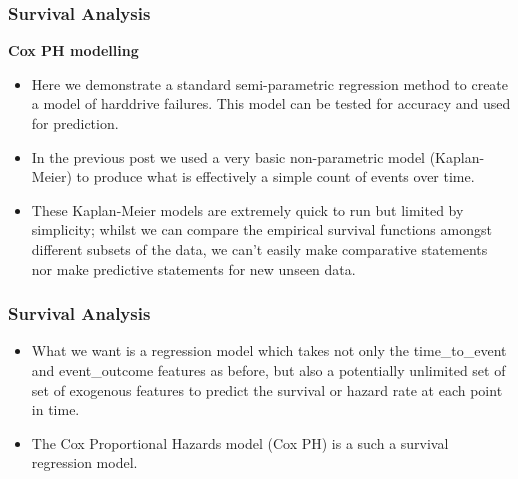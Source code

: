 \documentclass[]{beamer}
\begin{document}
	\begin{frame}
		\frametitle{Survival Analysis}
		\textbf{Cox PH modelling}
		
		\begin{itemize}
			\item Here we demonstrate a standard semi-parametric regression method to create a model of harddrive failures. This model can be tested for accuracy and used for prediction.
			
			\item In the previous post we used a very basic non-parametric model (Kaplan-Meier) to produce what is effectively a simple count of events over time. 
			\item These Kaplan-Meier models are extremely quick to run but limited by simplicity; whilst we can compare the empirical survival functions amongst different subsets of the data, we can't easily make comparative statements nor make predictive statements for new unseen data.
		\end{itemize}
		
	\end{frame}
	\begin{frame}
		\frametitle{Survival Analysis}
		\begin{itemize}
			\item What we want is a regression model which takes not only the time\_to\_event and event\_outcome features as before, but also a potentially unlimited set of set of exogenous features to predict the survival or hazard rate at each point in time.
			\item The Cox Proportional Hazards model (Cox PH) is a such a survival regression model.
		\end{itemize}
	\end{frame}
	
\end{document}
